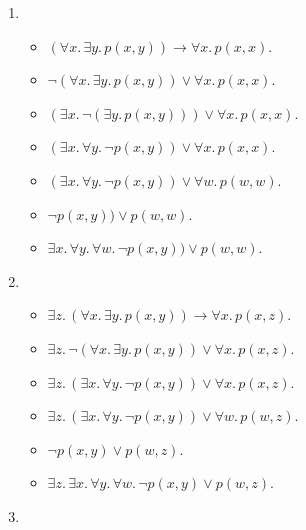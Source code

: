 \begin{exer}[2.4]
    $ $
    \begin{enumerate}[label=(\alph*)]
        \item %
            \begin{itemize}
                \item
                    $(\forall x.\, \exists y.\, p(x, y)) \rightarrow \forall x.\, p(x, x)$.
                \item
                    $\neg (\forall x.\, \exists y.\, p(x, y)) \lor \forall x.\, p(x, x)$.
                \item
                    $(\exists x.\, \neg(\exists y.\, p(x, y))) \lor \forall x.\, p(x, x)$.
                \item
                    $(\exists x.\, \forall y.\, \neg p(x, y)) \lor \forall x.\, p(x, x)$.
                \item
                    $(\exists x.\, \forall y.\, \neg p(x, y)) \lor \forall w.\, p(w, w)$.
                \item
                    $\neg p(x, y)) \lor p(w, w)$.
                \item
                    $\exists x.\, \forall y.\, \forall w.\, \neg p(x, y)) \lor p(w, w)$.
            \end{itemize}
        \item %
            \begin{itemize}
                \item
                    $\exists z.\, (\forall x.\, \exists y.\, p(x, y)) \rightarrow \forall x.\, p(x, z)$.
                \item
                    $\exists z.\, \neg(\forall x.\, \exists y.\, p(x, y)) \lor \forall x.\, p(x, z)$.
                \item
                    $\exists z.\, (\exists x.\, \forall y.\, \neg p(x, y)) \lor \forall x.\, p(x, z)$.
                \item
                    $\exists z.\, (\exists x.\, \forall y.\, \neg p(x, y)) \lor \forall w.\, p(w, z)$.
                \item
                    $\neg p(x, y) \lor p(w, z)$.
                \item
                    $\exists z.\, \exists x.\, \forall y.\, \forall w.\, \neg p(x, y) \lor p(w, z)$.
            \end{itemize}
        \item %
            \begin{itemize}

\end{itemize}
\end{enumerate}
\end{exer}

